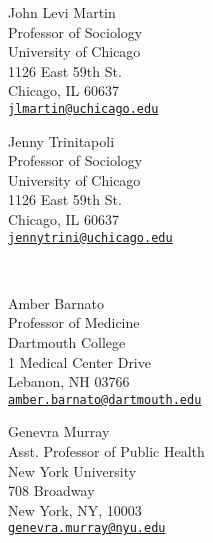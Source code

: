 \documentclass[11pt,article,oneside]{memoir}
\begin{document}
\bigskip
{}
\bigskip

\begin{minipage}[t]{0.48\textwidth}
	John Levi Martin \\
	Professor of Sociology \\
	University of Chicago \\
	1126 East 59th St. \\
	Chicago, IL 60637 \\
	\texttt{\href{mailto:jlmartin@uchicago.edu}{jlmartin@uchicago.edu}}
\end{minipage}
\hfill
\begin{minipage}[t]{0.48\textwidth}
	Jenny Trinitapoli \\
	Professor of Sociology \\
	University of Chicago \\
	1126 East 59th St. \\
	Chicago, IL 60637 \\
	\texttt{\href{mailto:jennytrini@uchicago.edu}{jennytrini@uchicago.edu}} \\
\end{minipage} \\

\bigskip

\begin{minipage}[t]{0.48\textwidth}
	Amber Barnato \\
	Professor of Medicine \\
	Dartmouth College \\
	1 Medical Center Drive \\
	Lebanon, NH 03766 \\
	\texttt{\href{mailto:amber.barnato@dartmouth.edu}{amber.barnato@dartmouth.edu}} \\
\end{minipage}
\hfill
\begin{minipage}[t]{0.48\textwidth}
	Genevra Murray \\
	Asst. Professor of Public Health \\
	New York University\\
	708 Broadway\\
	New York, NY, 10003\\
	\texttt{\href{mailto:genevra.murray@nyu.edu}{genevra.murray@nyu.edu}}
\end{minipage}
\end{document}
